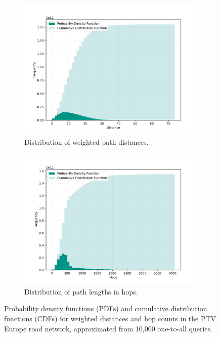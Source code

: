 \begin{figure}[tbhp]
    \centering
    \begin{subfigure}{0.45\linewidth}
        \centering
        \includegraphics[width=\linewidth]{graphics/distances_europe.pdf}
        \caption{Distribution of weighted path distances.}
        \label{fig:distance_distribution}
    \end{subfigure}
    \hfill
    \begin{subfigure}{0.45\linewidth}
        \centering
        \includegraphics[width=\linewidth]{graphics/hops_europe.pdf}
        \caption{Distribution of path lengths in hops.}
        \label{fig:hop_distribution}
    \end{subfigure}
    \caption{Probability density functions (PDFs) and cumulative distribution functions (CDFs) for weighted distances and hop counts in the PTV Europe road network, approximated from 10,000 one-to-all queries.}
    \label{fig:distance_hop_distribution}
\end{figure}
